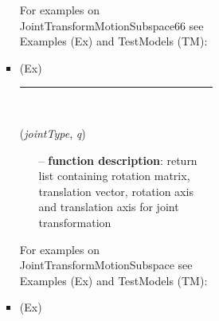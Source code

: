 \begin{itemize}[leftmargin=1.4cm]
\begin{itemize}[leftmargin=1.4cm]
\begin{itemize}[leftmargin=0.5cm]
\begin{itemize}[leftmargin=1.4cm]
\begin{itemize}[leftmargin=1.4cm]
\begin{itemize}[leftmargin=0.5cm]
\begin{itemize}[leftmargin=1.4cm]
\begin{itemize}[leftmargin=0.5cm]
\begin{itemize}[leftmargin=1.4cm]
\begin{itemize}[leftmargin=1.4cm]
\begin{itemize}[leftmargin=1.4cm]
%
%
\noindent For examples on JointTransformMotionSubspace66 see Examples (Ex) and TestModels (TM):
\bi
 \item \footnotesize {} (Ex)\ei

%
\noindent\rule{8cm}{0.75pt}\vspace{1pt} \\ 
\begin{flushleft}
\label{sec:kinematicTree:JointTransformMotionSubspace}
({\it jointType}, {\it q})
\end{flushleft}
\setlength{\itemindent}{0.7cm}
\begin{itemize}[leftmargin=0.7cm]
  \item[--]  {\bf function description}: return list containing rotation matrix, translation vector, rotation axis and translation axis for joint transformation\vspace{12pt}\end{itemize}
%
%
\noindent For examples on JointTransformMotionSubspace see Examples (Ex) and TestModels (TM):
\bi
 \item \footnotesize {} (Ex)\ei


\end{itemize}
\end{itemize}
\end{itemize}
\end{itemize}
\end{itemize}
\end{itemize}
\end{itemize}
\end{itemize}
\end{itemize}
\end{itemize}
\end{itemize}
